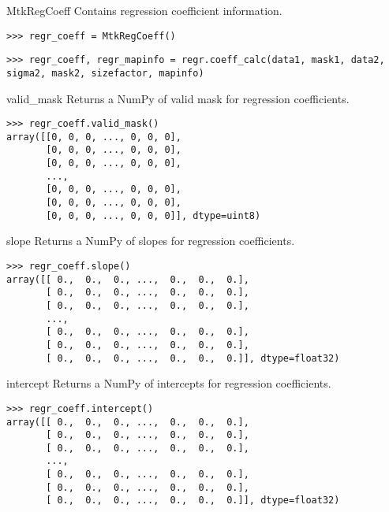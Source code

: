 \documentclass{howto}
\begin{document}
\begin{classdesc*}{MtkRegCoeff}
  Contains regression coefficient information.

\begin{verbatim}
>>> regr_coeff = MtkRegCoeff()
\end{verbatim}

\begin{verbatim}
>>> regr_coeff, regr_mapinfo = regr.coeff_calc(data1, mask1, data2, sigma2, mask2, sizefactor, mapinfo)
\end{verbatim}
\end{classdesc*}

\begin{methoddesc}{valid_mask}{}
  Returns a NumPy of valid mask for regression coefficients.

\begin{verbatim}
>>> regr_coeff.valid_mask()
array([[0, 0, 0, ..., 0, 0, 0],
       [0, 0, 0, ..., 0, 0, 0],
       [0, 0, 0, ..., 0, 0, 0],
       ...,
       [0, 0, 0, ..., 0, 0, 0],
       [0, 0, 0, ..., 0, 0, 0],
       [0, 0, 0, ..., 0, 0, 0]], dtype=uint8)
\end{verbatim}
\end{methoddesc}

\begin{methoddesc}{slope}{}
  Returns a NumPy of slopes for regression coefficients.

\begin{verbatim}
>>> regr_coeff.slope()
array([[ 0.,  0.,  0., ...,  0.,  0.,  0.],
       [ 0.,  0.,  0., ...,  0.,  0.,  0.],
       [ 0.,  0.,  0., ...,  0.,  0.,  0.],
       ...,
       [ 0.,  0.,  0., ...,  0.,  0.,  0.],
       [ 0.,  0.,  0., ...,  0.,  0.,  0.],
       [ 0.,  0.,  0., ...,  0.,  0.,  0.]], dtype=float32)
\end{verbatim}
\end{methoddesc}

\begin{methoddesc}{intercept}{}
  Returns a NumPy of intercepts for regression coefficients.

\begin{verbatim}
>>> regr_coeff.intercept()
array([[ 0.,  0.,  0., ...,  0.,  0.,  0.],
       [ 0.,  0.,  0., ...,  0.,  0.,  0.],
       [ 0.,  0.,  0., ...,  0.,  0.,  0.],
       ...,
       [ 0.,  0.,  0., ...,  0.,  0.,  0.],
       [ 0.,  0.,  0., ...,  0.,  0.,  0.],
       [ 0.,  0.,  0., ...,  0.,  0.,  0.]], dtype=float32)
\end{verbatim}
\end{methoddesc}
\end{document}
